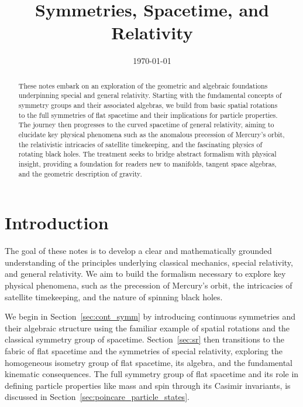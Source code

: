 \documentclass{amsart}
\theoremstyle{definition}
\theoremstyle{remark}
\begin{document}
\title{Symmetries, Spacetime, and Relativity}
\author{}
\date{\today}

\begin{abstract}
  These notes embark on an exploration of the geometric and algebraic foundations underpinning special and general relativity.
  Starting with the fundamental concepts of symmetry groups and their associated algebras, we build from basic spatial rotations to the full symmetries of flat spacetime and their implications for particle properties.
  The journey then progresses to the curved spacetime of general relativity, aiming to elucidate key physical phenomena such as the anomalous precession of Mercury's orbit, the relativistic intricacies of satellite timekeeping, and the fascinating physics of rotating black holes.
  The treatment seeks to bridge abstract formalism with physical insight, providing a foundation for readers new to manifolds, tangent space algebras, and the geometric description of gravity.
\end{abstract}

\maketitle

\section{Introduction}
\label{sec:intro}

The goal of these notes is to develop a clear and mathematically grounded understanding of the principles underlying classical mechanics, special relativity, and general relativity.
We aim to build the formalism necessary to explore key physical phenomena, such as the precession of Mercury's orbit, the intricacies of satellite timekeeping, and the nature of spinning black holes.

We begin in Section~\ref{sec:cont_symm} by introducing continuous symmetries and their algebraic structure using the familiar example of spatial rotations and the classical symmetry group of spacetime.
Section~\ref{sec:sr} then transitions to the fabric of flat spacetime and the symmetries of special relativity, exploring the homogeneous isometry group of flat spacetime, its algebra, and the fundamental kinematic consequences.
The full symmetry group of flat spacetime and its role in defining particle properties like mass and spin through its Casimir invariants, is discussed in Section~\ref{sec:poincare_particle_states}.
\end{document}
